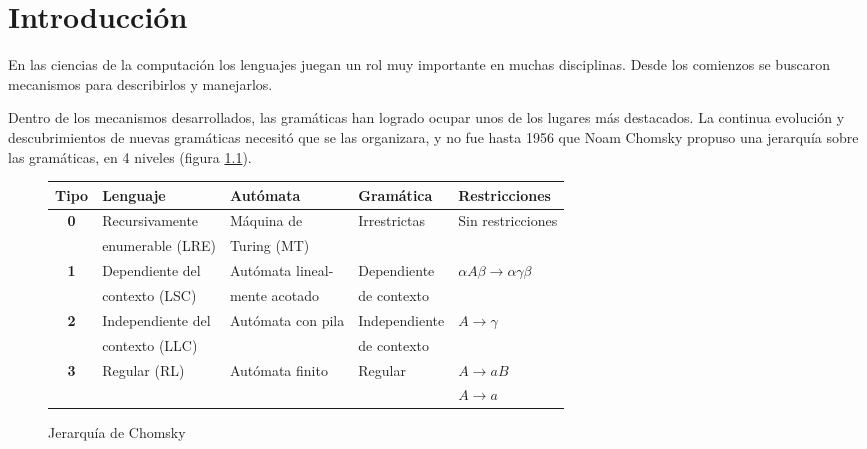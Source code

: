 \chapter{Introducci\'on}
\label{chap:intro}
\minitoc

En las ciencias de la computación los lenguajes juegan un rol muy importante en muchas disciplinas. Desde los comienzos se buscaron mecanismos para describirlos y manejarlos.

Dentro de los mecanismos desarrollados, las gramáticas han logrado ocupar unos de los lugares más destacados. La continua evolución y descubrimientos de nuevas gramáticas necesitó que se las organizara, y no fue hasta 1956 que Noam Chomsky propuso una jerarquía sobre las gramáticas, en 4 niveles (figura \ref{chomsky}).

\begin{figure}[h!]\centering 
\begin{tabular}{| c | p{3.5cm} | p{3.5cm} | p{2.4cm} | p{2.9cm}|}
\hline

\rowcolor{gris} \textbf{Tipo} & \textbf{Lenguaje} & \textbf{Autómata} & \textbf{Gramática} &  \textbf{Restricciones} \\ \hline

\multirow{2}{*}{\textbf{0}} & Recursivamente   & Máquina de  & \multirow{2}{*}{Irrestrictas} & \multirow{2}{*}{Sin restricciones} \\ 
                            & enumerable (LRE) & Turing (MT) & &  \\ \hline

\multirow{2}{*}{\textbf{1}} & Dependiente del & Autómata lineal- & Dependiente &\multirow{2}{*}{$\alpha A \beta \rightarrow \alpha\gamma\beta$} \\ 
                            & contexto (LSC)  & mente acotado              & de  contexto & \\ \hline

\multirow{2}{*}{\textbf{2}} & Independiente del & \multirow{2}{*}{Autómata con pila} & Independiente & \multirow{2}{*}{$A \rightarrow \gamma$} \\ 
                            & contexto (LLC)    &           & de contexto& \\ \hline

\multirow{2}{*}{\textbf{3}} & \multirow{2}{*}{Regular (RL)} & \multirow{2}{*}{Autómata finito} & \multirow{2}{*}{Regular} &$A \rightarrow aB$ \\ 
                            &              &                 & & $A \rightarrow a$ \\ \hline
\end{tabular}\caption{\label{chomsky} Jerarquía de Chomsky}
\end{figure}

